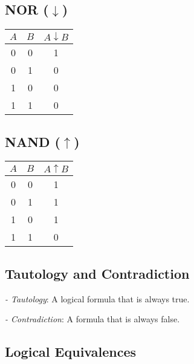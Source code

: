 \begin{multicols}{2}
	\vspace{1em}

	\subsection*{NOR (\(\downarrow\))}

	\begin{tabular}{ccc}
		\toprule
		\(A\) & \(B\) & \(A \downarrow B\) \\
		\midrule
		0   & 0   & 1                \\
		0   & 1   & 0                \\
		1   & 0   & 0                \\
		1   & 1   & 0                \\
		\bottomrule
	\end{tabular}

	\vspace{1em}

	\subsection*{NAND (\(\uparrow\))}

	\begin{tabular}{ccc}
		\toprule
		\(A\) & \(B\) & \(A \uparrow B\) \\
		\midrule
		0   & 0   & 1              \\
		0   & 1   & 1              \\
		1   & 0   & 1              \\
		1   & 1   & 0              \\
		\bottomrule
	\end{tabular}

\end{multicols}
\medskip

\subsection{Tautology and Contradiction}

\emph{- Tautology}: A logical formula that is always true.

\emph{- Contradiction}: A formula that is always false.

\newpage

\subsection{Logical Equivalences}

